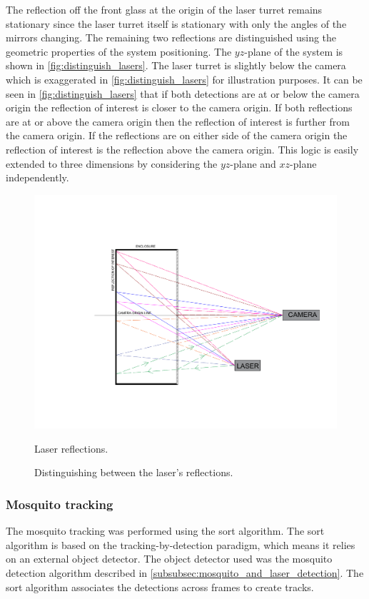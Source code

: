 The reflection off the front glass at the origin of the laser turret remains stationary since the laser turret itself is stationary with only the angles of the mirrors changing. The remaining two reflections are distinguished using the geometric properties of the system positioning. The $yz$-plane of the system is shown in \autoref{fig:distinguish_lasers}. The laser turret is slightly below the camera which is exaggerated in \autoref{fig:distinguish_lasers} for illustration purposes. It can be seen in \autoref{fig:distinguish_lasers} that if both detections are at or below the camera origin the reflection of interest is closer to the camera origin. If both reflections are at or above the camera origin then the reflection of interest is further from the camera origin. If the reflections are on either side of the camera origin the reflection of interest is the reflection above the camera origin. This logic is easily extended to three dimensions by considering the $yz$-plane and $xz$-plane independently.
\begin{figure}[h]
    \centering
    \includegraphics[width=\textwidth]{figures/distinguish_lasers.pdf}
    \caption{Laser reflections.}
    \caption{Distinguishing between the laser's reflections.}
    \label{fig:distinguish_lasers}
\end{figure}



\subsubsection{Mosquito tracking}
The mosquito tracking was performed using the \gls{sort} algorithm. The \gls{sort} algorithm is based on the tracking-by-detection paradigm, which means it relies on an external object detector. The object detector used was the mosquito detection algorithm described in \autoref{subsubsec:mosquito_and_laser_detection}. The \gls{sort} algorithm associates the detections across frames to create tracks.


